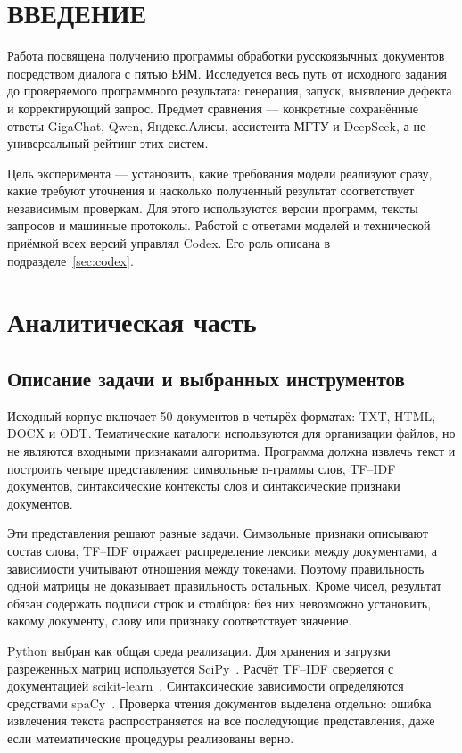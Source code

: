 \chapter*{ВВЕДЕНИЕ}
Работа посвящена получению программы обработки русскоязычных документов посредством диалога с пятью БЯМ. Исследуется весь путь от исходного задания до проверяемого программного результата: генерация, запуск, выявление дефекта и корректирующий запрос. Предмет сравнения — конкретные сохранённые ответы GigaChat, Qwen, Яндекс.Алисы, ассистента МГТУ и DeepSeek, а не универсальный рейтинг этих систем.

Цель эксперимента — установить, какие требования модели реализуют сразу, какие требуют уточнения и насколько полученный результат соответствует независимым проверкам. Для этого используются версии программ, тексты запросов и машинные протоколы. Работой с ответами моделей и технической приёмкой всех версий управлял Codex. Его роль описана в подразделе~\ref{sec:codex}.

\chapter{Аналитическая часть}
\section{Описание задачи и выбранных инструментов}
Исходный корпус включает 50 документов в четырёх форматах: TXT, HTML, DOCX и ODT. Тематические каталоги используются для организации файлов, но не являются входными признаками алгоритма. Программа должна извлечь текст и построить четыре представления: символьные n-граммы слов, TF--IDF документов, синтаксические контексты слов и синтаксические признаки документов.

Эти представления решают разные задачи. Символьные признаки описывают состав слова, TF--IDF отражает распределение лексики между документами, а зависимости учитывают отношения между токенами. Поэтому правильность одной матрицы не доказывает правильность остальных. Кроме чисел, результат обязан содержать подписи строк и столбцов: без них невозможно установить, какому документу, слову или признаку соответствует значение.

Python выбран как общая среда реализации. Для хранения и загрузки разреженных матриц используется SciPy~\cite{scipy}. Расчёт TF--IDF сверяется с документацией scikit-learn~\cite{sklearn}. Синтаксические зависимости определяются средствами spaCy~\cite{spacy}. Проверка чтения документов выделена отдельно: ошибка извлечения текста распространяется на все последующие представления, даже если математические процедуры реализованы верно.

